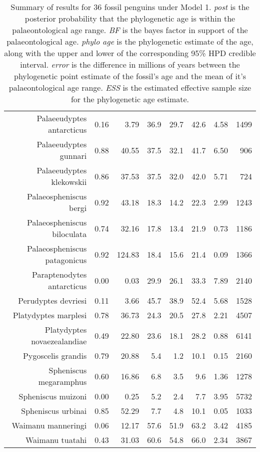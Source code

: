 \begin{table}[ht]
\begin{tabular}{rrrrrrrr}
  Palaeeudyptes antarcticus & 0.16 & 3.79 & 36.9 & 29.7 & 42.6 & 4.58 & 1499 \\ 
  Palaeeudyptes gunnari & 0.88 & 40.55 & 37.5 & 32.1 & 41.7 & 6.50 & 906 \\ 
  Palaeeudyptes klekowskii & 0.86 & 37.53 & 37.5 & 32.0 & 42.0 & 5.71 & 724 \\ 
  Palaeospheniscus bergi & 0.92 & 43.18 & 18.3 & 14.2 & 22.3 & 2.99 & 1243 \\ 
  Palaeospheniscus biloculata & 0.74 & 32.16 & 17.8 & 13.4 & 21.9 & 0.73 & 1186 \\ 
  Palaeospheniscus patagonicus & 0.92 & 124.83 & 18.4 & 15.6 & 21.4 & 0.09 & 1366 \\ 
  Paraptenodytes antarcticus & 0.00 & 0.03 & 29.9 & 26.1 & 33.3 & 7.89 & 2140 \\ 
  Perudyptes devriesi & 0.11 & 3.66 & 45.7 & 38.9 & 52.4 & 5.68 & 1528 \\ 
  Platydyptes marplesi & 0.78 & 36.73 & 24.3 & 20.5 & 27.8 & 2.21 & 4507 \\ 
  Platydyptes novaezealandiae & 0.49 & 22.80 & 23.6 & 18.1 & 28.2 & 0.88 & 6141 \\ 
  Pygoscelis grandis & 0.79 & 20.88 & 5.4 & 1.2 & 10.1 & 0.15 & 2160 \\ 
  Spheniscus megaramphus & 0.60 & 16.86 & 6.8 & 3.5 & 9.6 & 1.36 & 1278 \\ 
  Spheniscus muizoni & 0.00 & 0.25 & 5.2 & 2.4 & 7.7 & 3.95 & 5732 \\ 
  Spheniscus urbinai & 0.85 & 52.29 & 7.7 & 4.8 & 10.1 & 0.05 & 1033 \\ 
  Waimanu manneringi & 0.06 & 12.17 & 57.6 & 51.9 & 63.2 & 3.42 & 4185 \\ 
  Waimanu tuatahi & 0.43 & 31.03 & 60.6 & 54.8 & 66.0 & 2.34 & 3867 \\ 
   \hline
\end{tabular}
\caption{Summary of results for 36 fossil penguins under Model 1. {\em post} is the posterior probability that the phylogenetic age is within the palaeontological age range. {\em BF} is the bayes factor in support of the palaeontological age. {\em phylo age} is the phylogenetic estimate of the age, along with the upper and lower of the corresponding 95\% HPD credible interval. {\em error} is the difference in millions of years between the phylogenetic point estimate of the fossil's age and the mean of it's palaeontological age range. {\em ESS} is the estimated effective sample size for the phylogenetic age estimate.} 
\label{fossilTable1}
\end{table}
